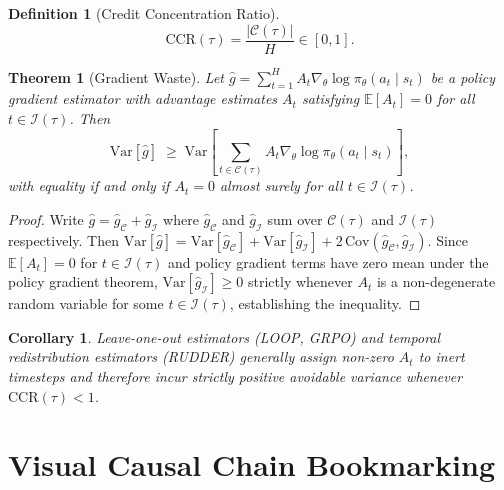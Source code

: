 \documentclass[11pt]{article}
\newtheorem{definition}{Definition}
\newtheorem{theorem}{Theorem}
\newtheorem{corollary}{Corollary}
\begin{document}
\begin{definition}[Credit Concentration Ratio]
\begin{equation}
\mathrm{CCR}(\tau) = \frac{|\mathcal{C}(\tau)|}{H} \in [0,1].
\end{equation}
\end{definition}

\begin{theorem}[Gradient Waste]
\label{thm:waste}
Let $\hat{g} = \sum_{t=1}^{H} A_t \nabla_\theta \log \pi_\theta(a_t \mid s_t)$
be a policy gradient estimator with advantage estimates $A_t$ satisfying
$\mathbb{E}[A_t] = 0$ for all $t \in \mathcal{I}(\tau)$. Then
\begin{equation}
\mathrm{Var}[\hat{g}] \;\geq\; \mathrm{Var}\!\left[\sum_{t \in \mathcal{C}(\tau)} A_t \nabla_\theta \log \pi_\theta(a_t \mid s_t)\right],
\end{equation}
with equality if and only if $A_t = 0$ almost surely for all $t \in \mathcal{I}(\tau)$.
\end{theorem}

\begin{proof}
Write $\hat{g} = \hat{g}_\mathcal{C} + \hat{g}_\mathcal{I}$ where $\hat{g}_\mathcal{C}$
and $\hat{g}_\mathcal{I}$ sum over $\mathcal{C}(\tau)$ and $\mathcal{I}(\tau)$
respectively. Then
$\mathrm{Var}[\hat{g}] = \mathrm{Var}[\hat{g}_\mathcal{C}] + \mathrm{Var}[\hat{g}_\mathcal{I}] + 2\,\mathrm{Cov}(\hat{g}_\mathcal{C}, \hat{g}_\mathcal{I})$.
Since $\mathbb{E}[A_t] = 0$ for $t \in \mathcal{I}(\tau)$ and policy gradient
terms have zero mean under the policy gradient theorem, $\mathrm{Var}[\hat{g}_\mathcal{I}] \geq 0$
strictly whenever $A_t$ is a non-degenerate random variable for some
$t \in \mathcal{I}(\tau)$, establishing the inequality.
\end{proof}

\begin{corollary}
Leave-one-out estimators (LOOP, GRPO) and temporal redistribution estimators
(RUDDER) generally assign non-zero $A_t$ to inert timesteps and therefore incur
strictly positive avoidable variance whenever $\mathrm{CCR}(\tau) < 1$.
\end{corollary}

\section{Visual Causal Chain Bookmarking}
\end{document}
